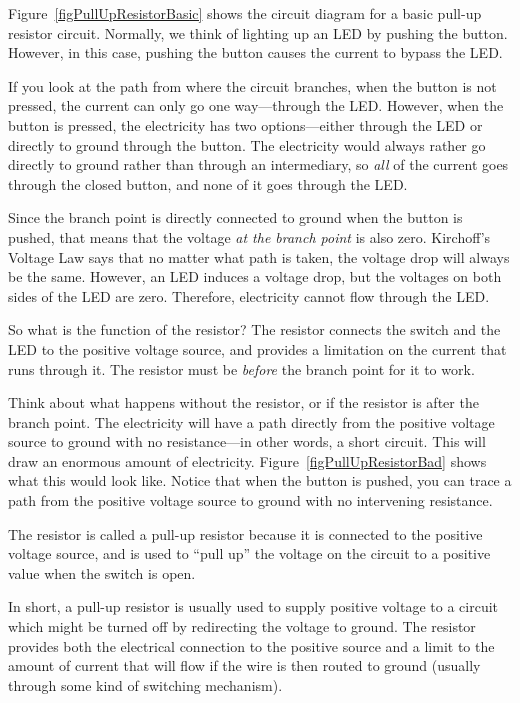 Figure~\ref{figPullUpResistorBasic} shows the circuit diagram for a basic pull-up resistor circuit.
Normally, we think of lighting up an LED by pushing the button.
However, in this case, pushing the button causes the current to bypass the LED.

If you look at the path from where the circuit branches, when the button is not pressed, the current can only go one way---through the LED.
However, when the button is pressed, the electricity has two options---either through the LED or directly to ground through the button.
The electricity would always rather go directly to ground rather than through an intermediary, so \emph{all} of the current goes through the closed button, and none of it goes through the LED.

Since the branch point is directly connected to ground when the button is pushed, that means that the voltage \emph{at the branch point} is also zero.
Kirchoff's Voltage Law says that no matter what path is taken, the voltage drop will always be the same.
However, an LED induces a voltage drop, but the voltages on both sides of the LED are zero.
Therefore, electricity cannot flow through the LED.

So what is the function of the resistor?
The resistor connects the switch and the LED to the positive voltage source, and provides a limitation on the current that runs through it.
The resistor must be \emph{before} the branch point for it to work.

Think about what happens without the resistor, or if the resistor is after the branch point.
The electricity will have a path directly from the positive voltage source to ground with no resistance---in other words, a short circuit.
This will draw an enormous amount of electricity.
Figure~\ref{figPullUpResistorBad} shows what this would look like.
Notice that when the button is pushed, you can trace a path from the positive voltage source to ground with no intervening resistance.


The resistor is called a pull-up resistor because it is connected to the positive voltage source, and is used to ``pull up'' the voltage on the circuit to a positive value when the switch is open.

In short, a pull-up resistor is usually used to supply positive voltage to a circuit which might be turned off by redirecting the voltage to ground.
The resistor provides both the electrical connection to the positive source and a limit to the amount of current that will flow if the wire is then routed to ground (usually through some kind of switching mechanism).

